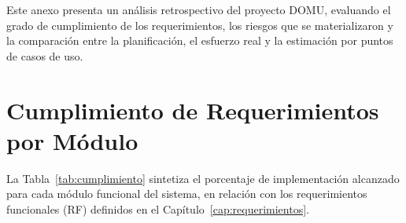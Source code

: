 
Este anexo presenta un análisis retrospectivo del proyecto DOMU, evaluando el grado de cumplimiento de los requerimientos, los riesgos que se materializaron y la comparación entre la planificación, el esfuerzo real y la estimación por puntos de casos de uso.

\section{Cumplimiento de Requerimientos por Módulo}

La Tabla~\ref{tab:cumplimiento} sintetiza el porcentaje de implementación alcanzado para cada módulo funcional del sistema, en relación con los requerimientos funcionales (RF) definidos en el Capítulo~\ref{cap:requerimientos}.

